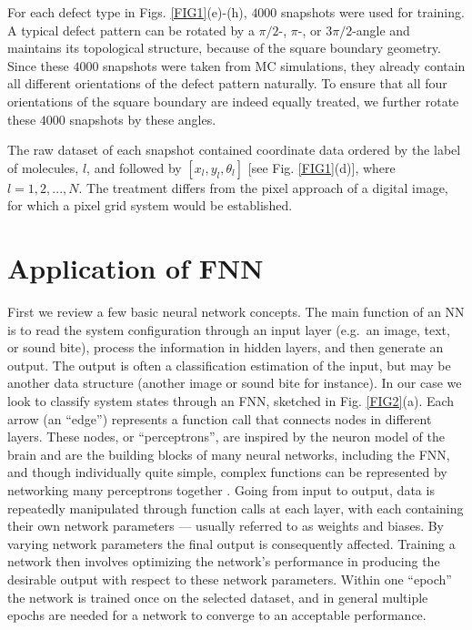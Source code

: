 %

For each defect type in Figs. \ref{FIG1}(e)-(h), $4000$ snapshots were used for training. A typical defect pattern can be rotated by a $\pi/2$-, $\pi$-, or $3\pi/2$-angle and maintains its topological structure, because of the square boundary geometry. Since these $4000$ snapshots were taken from MC simulations, they already contain all different orientations of the defect pattern naturally. To ensure that all four orientations of the square boundary are indeed equally treated, we further rotate these $4000$ snapshots by these angles.

The raw dataset of each snapshot contained coordinate data ordered by the label of molecules, $l$, and followed by $[x_l,y_l,\theta_l]$ [see Fig. \ref{FIG1}(d)], where $l=1,2,...,N$. The treatment differs from the pixel approach of a digital image, for which a pixel grid system would be established.



\section{Application of FNN}\label{FNN}


First we review a few basic neural network concepts.
The main function of an NN is to read the system configuration through an input layer (e.g.\ an image, text, or sound bite), process the information in  hidden layers, and then generate an output. The output is often a classification estimation of the input, but may be another data structure (another image or sound bite for instance). In our case we look to classify system states through an FNN, sketched in Fig. \ref{FIG2}(a).
Each arrow (an ``edge'') represents a function call that connects nodes in different layers. These nodes, or ``perceptrons'', are inspired by the neuron model of the brain and are the building blocks of many neural networks, including the FNN, and though individually quite simple, complex functions can be represented by networking many perceptrons together \cite{rosenblatt}.
Going from input to output, data is repeatedly manipulated through function calls at each layer, with each containing their own network parameters --- usually referred to as weights and biases.
By varying network parameters the final output is consequently affected.
Training a network then involves optimizing the network's performance in producing the desirable output with respect to these network parameters.
Within one ``epoch'' the network is trained once on the selected dataset, and in general multiple epochs are needed for a network to converge to an acceptable performance.

